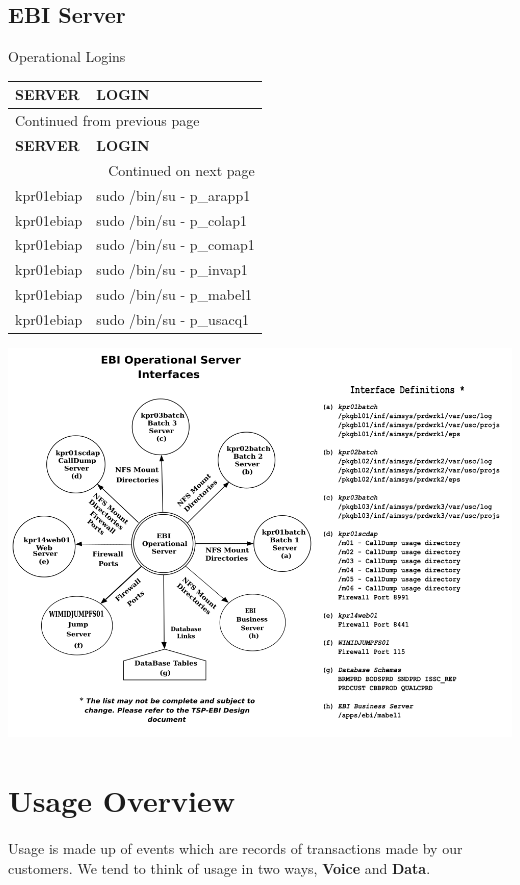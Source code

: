 \documentclass[12pt,twoside]{article}
\begin{document}
\normalsize
\subsection{EBI Server}
\label{sec:orgheadline15}
Operational Logins
\footnotesize

\begin{longtable}{l|l}
\hline
\textbf{SERVER} & \textbf{LOGIN}\\
\hline
\endfirsthead
\multicolumn{2}{l}{Continued from previous page} \\
\hline

\textbf{SERVER} & \textbf{LOGIN} \\

\hline
\endhead
\hline\multicolumn{2}{r}{Continued on next page} \\
\endfoot
\endlastfoot
\hline
kpr01ebiap & sudo /bin/su - p\_arapp1\\
kpr01ebiap & sudo /bin/su - p\_colap1\\
kpr01ebiap & sudo /bin/su - p\_comap1\\
kpr01ebiap & sudo /bin/su - p\_invap1\\
kpr01ebiap & sudo /bin/su - p\_mabel1\\
kpr01ebiap & sudo /bin/su - p\_usacq1\\
\hline
\end{longtable}
\normalsize
\begin{landscape}  
\includegraphics[width=.9\linewidth]{Pictures/EBI_Operational_Server.png}


\end{landscape} 
\newpage
\section{Usage Overview}
\label{sec:orgheadline27}
Usage is made up of events which are records of transactions made by our customers. We tend to think of usage
in two ways, \textbf{Voice} and \textbf{Data}.\\
\end{document}

